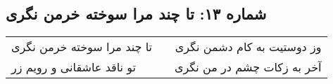 \begin{center}
\section*{شماره ۱۳: تا چند مرا سوخته خرمن نگری}
\label{sec:013}
\begin{longtable}{l p{0.5cm} r}
تا چند مرا سوخته خرمن نگری
&&
وز دوستیت به کام دشمن نگری
\\
تو ناقد عاشقانی و رویم زر
&&
آخر به زکات چشم در من نگری
\\
\end{longtable}
\end{center}
